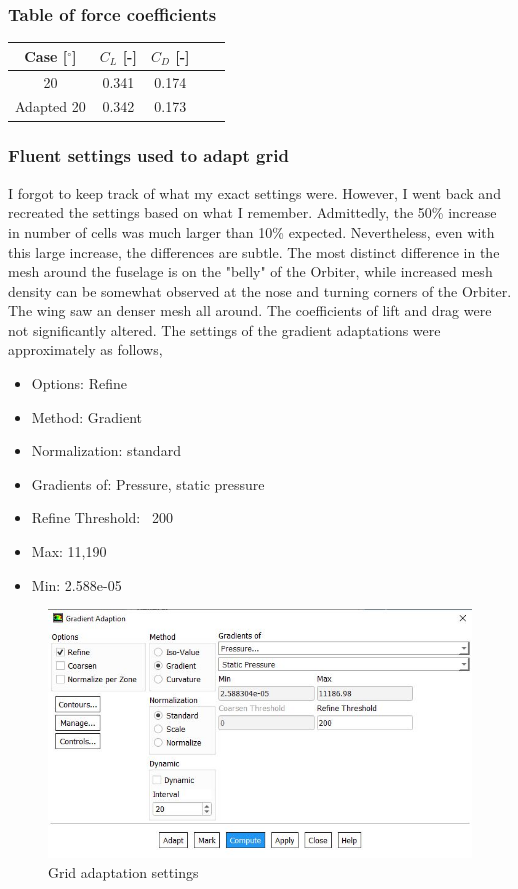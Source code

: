 \subsubsection{Table of force coefficients}
\begin{table}[H]
	\centering
	\begin{tabular}{|c|c|c|c|c|} \hline
		\centering
		\textbf{Case [$^\circ$]}       & $C_L$ [-]   & $C_D$ [-] \\ \hline
		20         & 0.341 & 0.174 \\ \hline
		Adapted 20 & 0.342 & 0.173 \\ \hline
	\end{tabular}
\end{table}
\subsubsection{Fluent settings used to adapt grid}

I forgot to keep track of what my exact settings were. However, I went back and recreated the settings based on what I remember. Admittedly, the 50\% increase in number of cells was much larger than 10\% expected. Nevertheless, even with this large increase, the differences are subtle. The most distinct difference in the mesh around the fuselage is on the "belly" of the Orbiter, while increased mesh density can be somewhat observed at the nose and turning corners of the Orbiter. The wing saw an denser mesh all around. The coefficients of lift and drag were not significantly altered. The settings of the gradient adaptations were approximately as follows, 

\begin{itemize}
	\item Options: Refine
	\item Method: Gradient
	\item Normalization: standard 
	\item Gradients of: Pressure, static pressure 
	\item Refine Threshold: ~200
	\item Max: 11,190
	\item Min: 2.588e-05
\end{itemize}


\begin{figure}[H]
     \centering
	 \includegraphics[width=\textwidth]{report_images/adaptation_settings.jpg}
	 \caption{Grid adaptation settings}
	 \label{fig: adapt_settings}
\end{figure}

